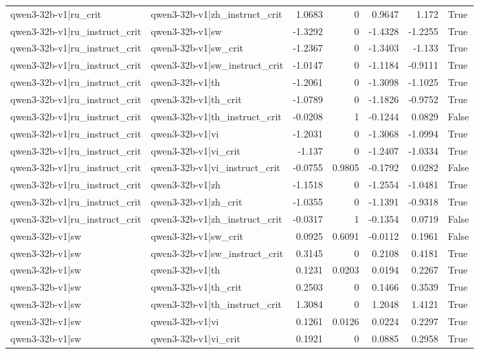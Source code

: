 \begin{table}
\begin{tabular}{l l r r r r l}
qwen3-32b-v1|ru_crit & qwen3-32b-v1|zh_instruct_crit & 1.0683 & 0 & 0.9647 & 1.172 & True \\
qwen3-32b-v1|ru_instruct_crit & qwen3-32b-v1|sw & -1.3292 & 0 & -1.4328 & -1.2255 & True \\
qwen3-32b-v1|ru_instruct_crit & qwen3-32b-v1|sw_crit & -1.2367 & 0 & -1.3403 & -1.133 & True \\
qwen3-32b-v1|ru_instruct_crit & qwen3-32b-v1|sw_instruct_crit & -1.0147 & 0 & -1.1184 & -0.9111 & True \\
qwen3-32b-v1|ru_instruct_crit & qwen3-32b-v1|th & -1.2061 & 0 & -1.3098 & -1.1025 & True \\
qwen3-32b-v1|ru_instruct_crit & qwen3-32b-v1|th_crit & -1.0789 & 0 & -1.1826 & -0.9752 & True \\
qwen3-32b-v1|ru_instruct_crit & qwen3-32b-v1|th_instruct_crit & -0.0208 & 1 & -0.1244 & 0.0829 & False \\
qwen3-32b-v1|ru_instruct_crit & qwen3-32b-v1|vi & -1.2031 & 0 & -1.3068 & -1.0994 & True \\
qwen3-32b-v1|ru_instruct_crit & qwen3-32b-v1|vi_crit & -1.137 & 0 & -1.2407 & -1.0334 & True \\
qwen3-32b-v1|ru_instruct_crit & qwen3-32b-v1|vi_instruct_crit & -0.0755 & 0.9805 & -0.1792 & 0.0282 & False \\
qwen3-32b-v1|ru_instruct_crit & qwen3-32b-v1|zh & -1.1518 & 0 & -1.2554 & -1.0481 & True \\
qwen3-32b-v1|ru_instruct_crit & qwen3-32b-v1|zh_crit & -1.0355 & 0 & -1.1391 & -0.9318 & True \\
qwen3-32b-v1|ru_instruct_crit & qwen3-32b-v1|zh_instruct_crit & -0.0317 & 1 & -0.1354 & 0.0719 & False \\
qwen3-32b-v1|sw & qwen3-32b-v1|sw_crit & 0.0925 & 0.6091 & -0.0112 & 0.1961 & False \\
qwen3-32b-v1|sw & qwen3-32b-v1|sw_instruct_crit & 0.3145 & 0 & 0.2108 & 0.4181 & True \\
qwen3-32b-v1|sw & qwen3-32b-v1|th & 0.1231 & 0.0203 & 0.0194 & 0.2267 & True \\
qwen3-32b-v1|sw & qwen3-32b-v1|th_crit & 0.2503 & 0 & 0.1466 & 0.3539 & True \\
qwen3-32b-v1|sw & qwen3-32b-v1|th_instruct_crit & 1.3084 & 0 & 1.2048 & 1.4121 & True \\
qwen3-32b-v1|sw & qwen3-32b-v1|vi & 0.1261 & 0.0126 & 0.0224 & 0.2297 & True \\
qwen3-32b-v1|sw & qwen3-32b-v1|vi_crit & 0.1921 & 0 & 0.0885 & 0.2958 & True \\

\end{tabular}
\end{table}
